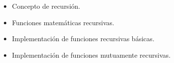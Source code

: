 \begin{itemize}
\item[\basic] Concepto de recursión.
\item[\basic] Funciones matemáticas recursivas.
\item[\basic] Implementación de funciones recursivas básicas.
\item[\basic] Implementación de funciones mutuamente recursivas.
\end{itemize}

